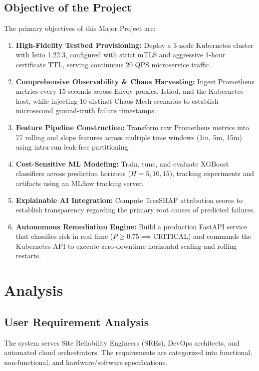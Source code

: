 \documentclass[12pt,a4paper]{report}
\begin{document}
\section{Objective of the Project}
The primary objectives of this Major Project are:
\begin{enumerate}
    \item \textbf{High-Fidelity Testbed Provisioning:} Deploy a 3-node Kubernetes cluster with Istio 1.22.3, configured with strict mTLS and aggressive 1-hour certificate TTL, serving continuous 20 QPS microservice traffic.
    \item \textbf{Comprehensive Observability \& Chaos Harvesting:} Ingest Prometheus metrics every 15 seconds across Envoy proxies, Istiod, and the Kubernetes host, while injecting 10 distinct Chaos Mesh scenarios to establish microsecond ground-truth failure timestamps.
    \item \textbf{Feature Pipeline Construction:} Transform raw Prometheus metrics into 77 rolling and slope features across multiple time windows (1m, 5m, 15m) using intra-run leak-free partitioning.
    \item \textbf{Cost-Sensitive ML Modeling:} Train, tune, and evaluate XGBoost classifiers across prediction horizons ($H=5, 10, 15$), tracking experiments and artifacts using an MLflow tracking server.
    \item \textbf{Explainable AI Integration:} Compute TreeSHAP attribution scores to establish transparency regarding the primary root causes of predicted failures.
    \item \textbf{Autonomous Remediation Engine:} Build a production FastAPI service that classifies risk in real time ($P \ge 0.75 \implies \text{CRITICAL}$) and commands the Kubernetes API to execute zero-downtime horizontal scaling and rolling restarts.
\end{enumerate}

\chapter{Analysis}

\section{User Requirement Analysis}
The system serves Site Reliability Engineers (SREs), DevOps architects, and automated cloud orchestrators. The requirements are categorized into functional, non-functional, and hardware/software specifications.
\end{document}
